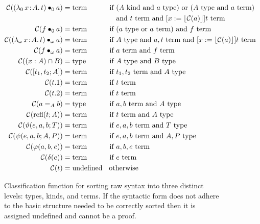 \begin{figure}
\begin{align*}
        \mathcal{C}(\app{(\abs{\lambda_0}{x}{A}{t})}{0}{a}) &=\!\! \pterm &\text{if }& (A\pkind \text{ and } a\ptype) \text{ or } (A\ptype \text{ and } a\pterm) \\
            &&&\text{and } t\pterm \text{ and } [x := \ptrunc{\mathcal{C}(a)}]t\pterm \\
        \mathcal{C}(\app{f}{0}{a}) &=\!\! \pterm &\text{if }& (a\ptype \text{ or } a\pterm) \text{ and } f\pterm \\
        \mathcal{C}(\app{(\abs{\lambda_\omega}{x}{A}{t})}{\omega}{a}) &=\!\! \pterm &\text{if }& A\ptype \text{ and } a, t\pterm \text{ and } [x := \ptrunc{\mathcal{C}(a)}]t\pterm \\
        \mathcal{C}(\app{f}{\omega}{a}) &=\!\! \pterm &\text{if }& a\pterm \text{ and } f\pterm \\
        \mathcal{C}((x : A) \cap B) &=\!\! \ptype &\text{if }& A\ptype \text{ and } B\ptype \\
        \mathcal{C}([t_1, t_2; A]) &=\!\! \pterm &\text{if }& t_1, t_2\pterm \text{ and } A\ptype \\
        \mathcal{C}(t.1) &=\!\! \pterm &\text{if }& t\pterm \\
        \mathcal{C}(t.2) &=\!\! \pterm &\text{if }& t\pterm \\
        \mathcal{C}(a =_A b) &=\!\! \ptype &\text{if }& a, b\pterm \text{ and } A\ptype \\
        \mathcal{C}(\prefl(t; A)) &=\!\! \pterm &\text{if }& t\pterm \text{ and } A\ptype \\
        \mathcal{C}(\vartheta(e, a, b; T)) &=\!\! \pterm &\text{if }& e, a, b\pterm \text{ and } T\ptype \\
        \mathcal{C}(\psi(e, a, b; A, P)) &=\!\! \pterm &\text{if }& e, a, b\pterm \text{ and } A, P\ptype \\
        \mathcal{C}(\varphi(a, b, e)) &=\!\! \pterm &\text{if }& a, b, e\pterm \\
        \mathcal{C}(\delta(e)) &=\!\! \pterm &\text{if }& e\pterm \\
        \mathcal{C}(t) &= \text{undefined} &&\!\!\!\!\!\!\text{otherwise}
    \end{align*}
    \caption{
        Classification function for sorting raw syntax into three distinct levels: types, kinds, and terms.
        If the syntactic form does not adhere to the basic structure needed to be correctly sorted then it is assigned undefined and cannot be a proof.
    }
    \label{fig:2:classify}
\end{figure}
